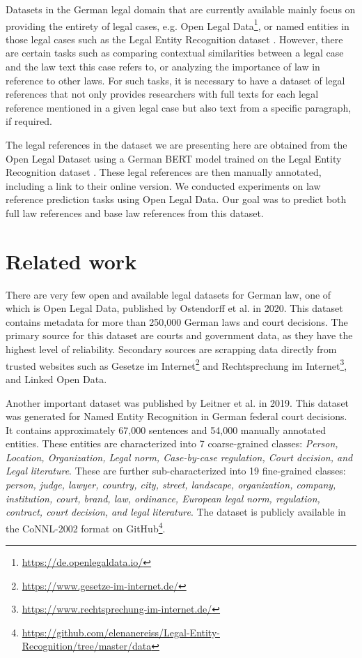 \documentclass[sigconf]{acmart}
\begin{document}
Datasets in the German legal domain that are currently available mainly focus on providing the entirety of legal cases, e.g. Open Legal Data\footnote{\url{https://de.openlegaldata.io/}}, or named entities in those legal cases such as the Legal Entity Recognition dataset \cite{leitner2020dataset}. However, there are certain tasks such as comparing contextual similarities between a legal case and the law text this case refers to, or analyzing the importance of law in reference to other laws. For such tasks, it is necessary to have a dataset of legal references that not only provides researchers with full texts for each legal reference mentioned in a given legal case but also text from a specific paragraph, if required.

The legal references in the dataset we are presenting here are obtained from the Open Legal Dataset using a German BERT model \cite{chan2020german} trained on the Legal Entity Recognition dataset \cite{leitner2020dataset}. These legal references are then manually annotated, including a link to their online version. We conducted experiments on law reference prediction tasks using Open Legal Data. Our goal was to predict both full law references and base law references from this dataset.

\section{Related work}

There are very few open and available legal datasets for German law, one of which is Open Legal Data, published by Ostendorff et al. \cite{ostendorff2020towards} in 2020. This dataset contains metadata for more than 250,000 German laws and court decisions. The primary source for this dataset are courts and government data, as they have the highest level of reliability. Secondary sources are scrapping data directly from trusted websites such as Gesetze im Internet\footnote{\url{https://www.gesetze-im-internet.de/}} and Rechtsprechung im Internet\footnote{\url{https://www.rechtsprechung-im-internet.de/}}, and Linked Open Data.

Another important dataset was published by Leitner et al. \cite{leitner2020dataset} in 2019. This dataset was generated for Named Entity Recognition in German federal court decisions. It contains approximately 67,000 sentences and 54,000 manually annotated entities. These entities are characterized into 7 coarse-grained classes: \textit{Person, Location, Organization, Legal norm, Case-by-case regulation, Court decision, and Legal literature}. These are further sub-characterized into 19 fine-grained classes: \textit{person, judge, lawyer, country, city, street, landscape, organization, company, institution, court, brand, law, ordinance, European legal norm, regulation, contract, court decision, and legal literature}. The dataset is publicly available in the CoNNL-2002 format \cite{sang2003introduction} on GitHub\footnote{\url{https://github.com/elenanereiss/Legal-Entity-Recognition/tree/master/data}}.
\end{document}
